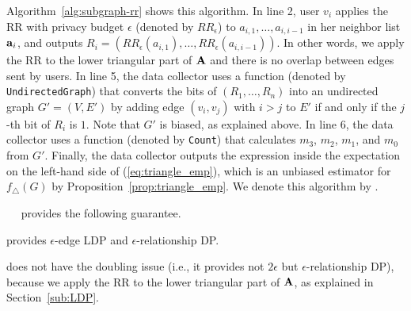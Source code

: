 Algorithm~\ref{alg:subgraph-rr} shows this algorithm. 
In line 2, user $v_i$ applies the RR with privacy budget $\epsilon$ (denoted by $RR_\epsilon$) to $a_{i,1}, \ldots, a_{i,i-1}$ 
in her neighbor list $\mathbf{a}_i$, and outputs $R_i = (RR_\epsilon(a_{i,1}), \ldots, RR_\epsilon(a_{i,i-1}))$. 
In other words, we apply the RR to the lower triangular part of $\mathbf{A}$ and there is no overlap between edges sent by users. 
In line 5, the data collector uses a function (denoted by \texttt{UndirectedGraph}) 
that converts the bits of $(R_1, \ldots, R_n)$ into an undirected graph $G'
= (V, E')$ by adding edge $(v_i,v_j)$ with $i>j$ to $E'$ if and only if the $j$-th bit of
$R_i$ is $1$. 
Note that $G'$ is biased, as explained above. 
In line 6, the data collector uses a function (denoted by 
\texttt{Count}) that calculates $m_3$, $m_2$, $m_1$, and $m_0$ from $G'$. 
Finally, the data collector outputs the expression inside the expectation on
the left-hand side of (\ref{eq:triangle_emp}), which is an unbiased estimator for 
$f_\triangle(G)$ by Proposition~\ref{prop:triangle_emp}.
We denote this algorithm by .



\smallskip
{}~~ 
provides the following guarantee.

\begin{theorem}\label{thm:subgraph-rr_LDP}
   provides $\epsilon$-edge LDP and $\epsilon$-relationship DP.
\end{theorem}

 does not have the doubling issue (i.e., it provides not $2\epsilon$ but $\epsilon$-relationship DP), because we apply the RR to the lower triangular part of $\mathbf{A}$, as explained in Section~\ref{sub:LDP}.

